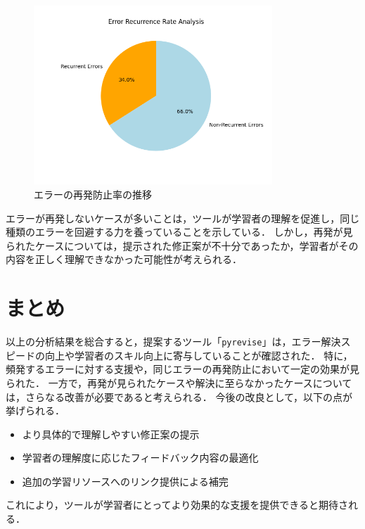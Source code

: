 \documentclass[12pt,twoside]{jbook}
\newcommand{\pyrevise}{\texttt{pyrevise}}
\begin{document}
\begin{figure}[h]
  \centering
  \includegraphics[width=0.8\textwidth]{images/recurrence_analysis.png}
  \caption{エラーの再発防止率の推移}
  \label{fig:recurrence}
\end{figure}

エラーが再発しないケースが多いことは，ツールが学習者の理解を促進し，同じ種類のエラーを回避する力を養っていることを示している．
しかし，再発が見られたケースについては，提示された修正案が不十分であったか，学習者がその内容を正しく理解できなかった可能性が考えられる．


\chapter{まとめ}
以上の分析結果を総合すると，提案するツール「\pyrevise」は，エラー解決スピードの向上や学習者のスキル向上に寄与していることが確認された．
特に，頻発するエラーに対する支援や，同じエラーの再発防止において一定の効果が見られた．
一方で，再発が見られたケースや解決に至らなかったケースについては，さらなる改善が必要であると考えられる．
今後の改良として，以下の点が挙げられる． 
\begin{itemize} 
  \item より具体的で理解しやすい修正案の提示 
  \item 学習者の理解度に応じたフィードバック内容の最適化 
  \item 追加の学習リソースへのリンク提供による補完 
\end{itemize}

これにより，ツールが学習者にとってより効果的な支援を提供できると期待される．


%
%




\appendix
\end{document}

